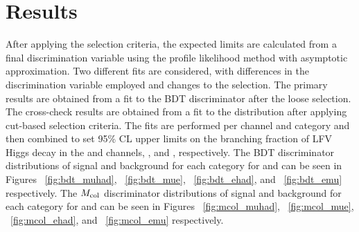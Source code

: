 %
%

\chapter{Results}
\label{results}

After applying the selection criteria, the expected limits are calculated from a final discrimination variable using the profile likelihood method with asymptotic approximation. Two different fits are considered, with differences in the discrimination variable employed and changes to the selection. The primary results are obtained from a fit to the BDT discriminator after the loose selection. The cross-check results are obtained from a fit to the \mcol distribution after applying cut-based selection criteria. The fits are performed per channel and category and then combined to set 95\% CL upper limits on the branching fraction of LFV Higgs decay in the \Hmt and \Het channels, \BHmt, and \BHet, respectively. The BDT discriminator distributions of signal and background for each category for \Hmt and \Het can be seen in Figures ~\ref{fig:bdt_muhad}, ~\ref{fig:bdt_mue}, ~\ref{fig:bdt_ehad}, and ~\ref{fig:bdt_emu} respectively. The $M_{\text{col}}$ discriminator distributions of signal and background for each category for \Hmt and \Het can be seen in Figures ~\ref{fig:mcol_muhad}, ~\ref{fig:mcol_mue}, ~\ref{fig:mcol_ehad}, and ~\ref{fig:mcol_emu} respectively.

